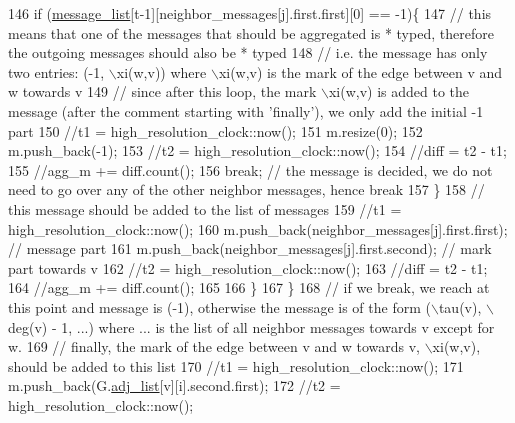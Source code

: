 \begin{DoxyCode}
146               \textcolor{keywordflow}{if} (\hyperlink{classgraph__message_aa17fdb629b423343edfafa97252763ef}{message\_list}[t-1][neighbor\_messages[j].first.first][0] == -1)\{
147                 \textcolor{comment}{// this means that one of the messages that should be aggregated is * typed, therefore the
       outgoing messages should also be * typed}
148                 \textcolor{comment}{// i.e. the message has only two entries: (-1, \(\backslash\)xi(w,v)) where \(\backslash\)xi(w,v) is the mark of the
       edge between v and w towards v}
149                 \textcolor{comment}{// since after this loop, the mark \(\backslash\)xi(w,v) is added to the message (after the comment
       starting with 'finally'), we only add the initial -1 part}
150                 \textcolor{comment}{//t1 = high\_resolution\_clock::now();}
151                 m.resize(0);
152                 m.push\_back(-1);
153                 \textcolor{comment}{//t2 = high\_resolution\_clock::now();}
154                 \textcolor{comment}{//diff = t2 - t1;}
155                 \textcolor{comment}{//agg\_m += diff.count();}
156                 \textcolor{keywordflow}{break}; \textcolor{comment}{// the message is decided, we do not need to go over any of the other neighbor
       messages, hence break}
157               \}
158               \textcolor{comment}{// this message should be added to the list of messages}
159               \textcolor{comment}{//t1 = high\_resolution\_clock::now();}
160               m.push\_back(neighbor\_messages[j].first.first); \textcolor{comment}{// message part}
161               m.push\_back(neighbor\_messages[j].first.second); \textcolor{comment}{// mark part towards v}
162               \textcolor{comment}{//t2 = high\_resolution\_clock::now();}
163               \textcolor{comment}{//diff = t2 - t1;}
164               \textcolor{comment}{//agg\_m += diff.count();}
165 
166             \}
167           \}
168           \textcolor{comment}{// if we break, we reach at this point and message is (-1), otherwise the message is of the form
       (\(\backslash\)tau(v), \(\backslash\)deg(v) - 1, ...) where ... is the list of all neighbor messages towards v except for w. }
169           \textcolor{comment}{// finally, the mark of the edge between v and w towards v, \(\backslash\)xi(w,v), should be added to this
       list}
170           \textcolor{comment}{//t1 = high\_resolution\_clock::now();}
171           m.push\_back(G.\hyperlink{classmarked__graph_a1a0bf7ca413a278763f7c878b3b6fd6f}{adj\_list}[v][i].second.first);
172           \textcolor{comment}{//t2 = high\_resolution\_clock::now();}

\end{DoxyCode}
